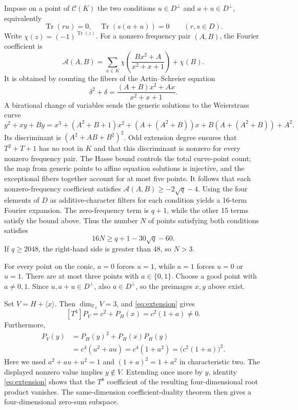 \documentclass[11pt]{amsart}
\numberwithin{equation}{section}
\theoremstyle{definition}
\theoremstyle{remark}
\newcommand{\Ftwo}{\mathbb F_2}
\newcommand{\tr}{\operatorname{Tr}}
\newcommand{\dimf}{\dim_{\Ftwo}}
\begin{document}
Impose on a point of $\mathcal C(K)$ the two conditions $u\in D^\perp$ and $a+u\in D^\perp$, equivalently
\[
 \tr(ru)=0,\quad \tr(s(a+u))=0\qquad(r,s\in D).
\]
Write $\chi(z)=(-1)^{\tr(z)}$. For a nonzero frequency pair $(A,B)$, the Fourier coefficient is
\[
 \mathcal A(A,B)=\sum_{x\in K}\chi\!\left(\frac{Bx^2+A}{x^2+x+1}\right)+\chi(B).
\]
It is obtained by counting the fibers of the Artin--Schreier equation
\[
 \delta^2+\delta=\frac{(A+B)x^2+Ax}{x^2+x+1}.
\]
A birational change of variables sends the generic solutions to the Weierstrass curve
\[
 y^2+xy+By=x^3+(A^2+B+1)x^2+(A+(A^2+B))x+B(A+(A^2+B))+A^2.
\]
Its discriminant is $(A^2+AB+B^2)^2$. Odd extension degree ensures that $T^2+T+1$ has no root in $K$ and that this discriminant is nonzero for every nonzero frequency pair. The Hasse bound controls the total curve-point count; the map from generic points to affine equation solutions is injective, and the exceptional fibers together account for at most five points. It follows that each nonzero-frequency coefficient satisfies $\mathcal A(A,B)\ge-2\sqrt q-4$. Using the four elements of $D$ as additive-character filters for each condition yields a 16-term Fourier expansion. The zero-frequency term is $q+1$, while the other 15 terms satisfy the bound above. Thus the number $N$ of points satisfying both conditions satisfies
\begin{equation}\label{eq:k4count}
 16N\ge q+1-30\sqrt q-60.
\end{equation}
If $q\ge2048$, the right-hand side is greater than $48$, so $N>3$.

For every point on the conic, $a=0$ forces $u=1$, while $a=1$ forces $u=0$ or $u=1$. There are at most three points with $a\in\{0,1\}$. Choose a good point with $a\ne0,1$. Since $u,a+u\in D^\perp$, also $a\in D^\perp$, so the preimages $x,y$ above exist.

Set $V=H+\langle x\rangle$. Then $\dimf V=3$, and \eqref{eq:extension} gives
\[
 [T^4]P_V=c^2+P_H(x)=c^2(1+a)\ne0.
\]
Furthermore,
\begin{align*}
 P_V(y)&=P_H(y)^2+P_H(x)P_H(y)\\
 &=c^4(u^2+au)=c^4(1+a^2)=\bigl(c^2(1+a)\bigr)^2.
\end{align*}
Here we used $a^2+au+u^2=1$ and $(1+a)^2=1+a^2$ in characteristic two. The displayed nonzero value implies $y\notin V$. Extending once more by $y$, identity \eqref{eq:extension} shows that the $T^8$ coefficient of the resulting four-dimensional root product vanishes. The same-dimension coefficient-duality theorem then gives a four-dimensional zero-sum subspace.
\end{document}
